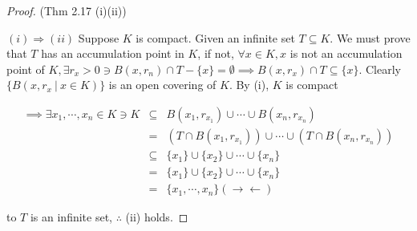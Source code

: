 \begin{proof}(Thm 2.17 (i)(ii))
	
	$(i) \Rightarrow (ii)$ Suppose $K$ is compact. Given an infinite set $T \subseteq K$. We must prove that $T$ has an accumulation point in $K$, if not, $\forall x \in K, x$ is not an accumulation point of $K,\exists r_x > 0 \ni B(x,r_n) \cap T - \{x\} = \emptyset \implies B(x,r_x) \cap T \subseteq \{x\}$. Clearly $\{B(x,r_x~|~x \in K)\}$ is an open covering of $K$. By (i), $K$ is compact
	
	 \begin{eqnarray*}
	 	\implies \exists x_1,\cdots,x_n \in K \ni K &\subseteq& B(x_1,r_{x_1}) \cup \cdots \cup B(x_n,r_{x_n})\\
	 	&=& (T \cap B(x_1,r_{x_1})) \cup \cdots \cup (T \cap B(x_n,r_{x_n}))\\
	 	&\subseteq& \{x_1\} \cup \{x_2\} \cup \cdots \cup \{x_n\}\\
	 	&=& \{x_1\} \cup \{x_2\} \cup \cdots \cup \{x_n\}\\
	 	&=& \{x_1,\cdots,x_n\} (\rightarrow \leftarrow)
	 \end{eqnarray*}
	 
	 to $T$ is an infinite set, $\therefore$ (ii) holds.
\end{proof}





























